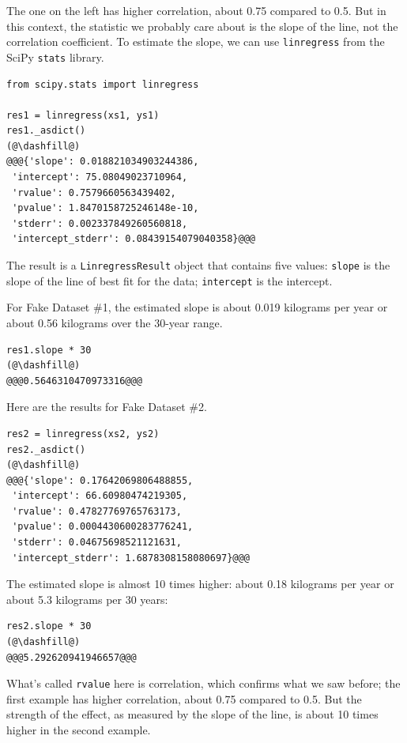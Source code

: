 The one on the left has higher correlation, about 0.75 compared to 0.5.
But in this context, the statistic we probably care about is the slope
of the line, not the correlation coefficient. To estimate the slope, we
can use \passthrough{\lstinline!linregress!} from the SciPy
\passthrough{\lstinline!stats!} library.

\begin{lstlisting}[]
from scipy.stats import linregress

res1 = linregress(xs1, ys1)
res1._asdict()
(@\dashfill@)
@@@{'slope': 0.018821034903244386,
 'intercept': 75.08049023710964,
 'rvalue': 0.7579660563439402,
 'pvalue': 1.8470158725246148e-10,
 'stderr': 0.002337849260560818,
 'intercept_stderr': 0.08439154079040358}@@@
\end{lstlisting}

The result is a \passthrough{\lstinline!LinregressResult!} object that
contains five values: \passthrough{\lstinline!slope!} is the slope of
the line of best fit for the data; \passthrough{\lstinline!intercept!}
is the intercept.

For Fake Dataset \#1, the estimated slope is about 0.019 kilograms per
year or about 0.56 kilograms over the 30-year range.

\begin{lstlisting}[]
res1.slope * 30
(@\dashfill@)
@@@0.5646310470973316@@@
\end{lstlisting}

Here are the results for Fake Dataset \#2.

\begin{lstlisting}[]
res2 = linregress(xs2, ys2)
res2._asdict()
(@\dashfill@)
@@@{'slope': 0.17642069806488855,
 'intercept': 66.60980474219305,
 'rvalue': 0.47827769765763173,
 'pvalue': 0.0004430600283776241,
 'stderr': 0.04675698521121631,
 'intercept_stderr': 1.6878308158080697}@@@
\end{lstlisting}

The estimated slope is almost 10 times higher: about 0.18 kilograms per
year or about 5.3 kilograms per 30 years:

\begin{lstlisting}[]
res2.slope * 30
(@\dashfill@)
@@@5.292620941946657@@@
\end{lstlisting}

What's called \passthrough{\lstinline!rvalue!} here is correlation,
which confirms what we saw before; the first example has higher
correlation, about 0.75 compared to 0.5. But the strength of the effect,
as measured by the slope of the line, is about 10 times higher in the
second example.


